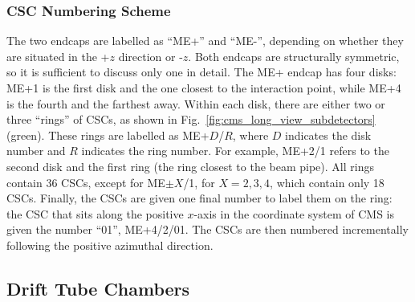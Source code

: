 \subsubsection{CSC Numbering Scheme}
\label{subsubsec:csc_numbering}
The two endcaps are labelled as ``ME+'' and ``ME-'', depending on whether they are situated in the +$z$ direction or -$z$.
Both endcaps are structurally symmetric, so it is sufficient to discuss only one in detail.
The ME+ endcap has four disks: ME+1 is the first disk and the one closest to the interaction point, while ME+4 is the fourth and the farthest away. 
Within each disk, there are either two or three ``rings'' of CSCs, as shown in Fig.~\ref{fig:cms_long_view_subdetectors} (green).
These rings are labelled as ME+$D$/$R$, where $D$ indicates the disk number and $R$ indicates the ring number.
For example, ME+2/1 refers to the second disk and the first ring (the ring closest to the beam pipe).
All rings contain 36 CSCs, except for ME$\pm X$/1, for $X= 2,3,4$, which contain only 18 CSCs.
Finally, the CSCs are given one final number to label them on the ring:
the CSC that sits along the positive $x$-axis in the coordinate system of CMS is given the number ``01'', \eg ME+4/2/01. 
The CSCs are then numbered incrementally following the positive azimuthal direction.

\subsection{Drift Tube Chambers}
\label{subsec:dt}

